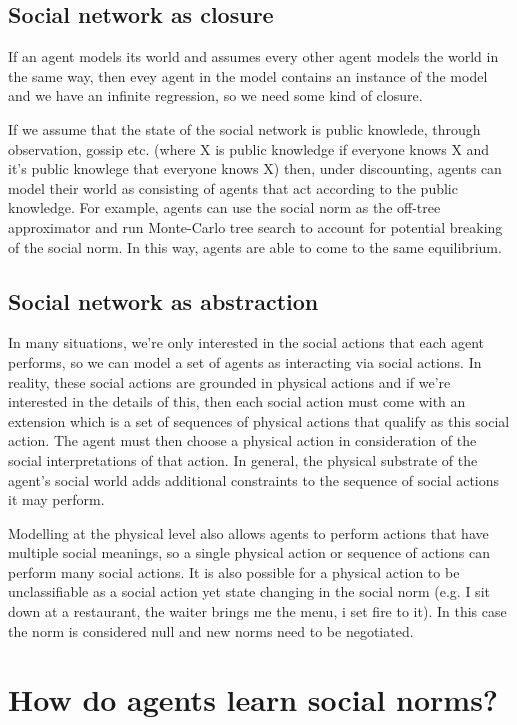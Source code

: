 \documentclass[a4paper]{article}
\begin{document}
\subsection{Social network as closure}

If an agent models its world and assumes every other agent models the world in the same way, then evey agent in the model contains an instance of the model and we have an infinite regression, so we need some kind of closure.

If we assume that the state of the social network is public knowlede, through observation, gossip etc. (where X is public knowledge if everyone knows X and it's public knowlege that everyone knows X) then, under discounting, agents can model their world as consisting of agents that act according to the public knowledge. For example, agents can use the social norm as the off-tree approximator and run Monte-Carlo tree search to account for potential breaking of the social norm. In this way, agents are able to come to the same equilibrium.



\subsection{Social network as abstraction}

In many situations, we're only interested in the social actions that each agent performs, so we can model a set of agents as interacting via social actions. In reality, these social actions are grounded in physical actions and if we're interested in the details of this, then each social action must come with an extension which is a set of sequences of physical actions that qualify as this social action. The agent must then choose a physical action in consideration of the social interpretations of that action. In general, the physical substrate of the agent's social world adds additional constraints to the sequence of social actions it may perform.

Modelling at the physical level also allows agents to perform actions that have multiple social meanings, so a single physical action or sequence of actions can perform many social actions. It is also possible for a physical action to be unclassifiable as a social action yet state changing in the social norm (e.g. I sit down at a restaurant, the waiter brings me the menu, i set fire to it). In this case the norm is considered null and new norms need to be negotiated.

\section{How do agents learn social norms?}
\end{document}
